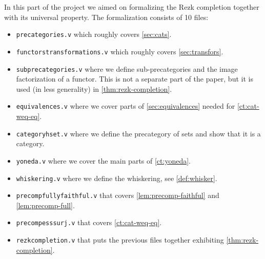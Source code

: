 In this part of the project we aimed on formalizing the Rezk completion together with its universal property. The formalization consists of 10 files:
\begin{itemize}
 \item \texttt{precategories.v} which roughly covers \autoref{sec:cats}.
 \item \texttt{functors\textunderscore transformations.v} which roughly covers \autoref{sec:transfors}.
 \item \texttt{sub\textunderscore precategories.v} where we define sub-precategories and
                 the image factorization of a functor. 
          This is not a separate part of the paper, but it is used (in less generality) in \autoref{thm:rezk-completion}.
 \item \texttt{equivalences.v} where we cover parts of \autoref{sec:equivalences} needed for \autoref{ct:cat-weq-eq}.
 \item \texttt{category\textunderscore hset.v} where we define the precategory of sets and show that it is a category.
 \item \texttt{yoneda.v} where we cover the main parts of \autoref{ct:yoneda}.
 \item \texttt{whiskering.v} where we define the whiskering, see \autoref{def:whisker}.
 \item \texttt{precomp\textunderscore fully\textunderscore faithful.v} that covers \autoref{lem:precomp-faithful} and \ref{lem:precomp-full}.
 \item \texttt{precomp\textunderscore ess\textunderscore surj.v} that covers \autoref{ct:cat-weq-eq}.
 \item \texttt{rezk\textunderscore completion.v} that puts the previous files together exhibiting \autoref{thm:rezk-completion}.
\end{itemize}






